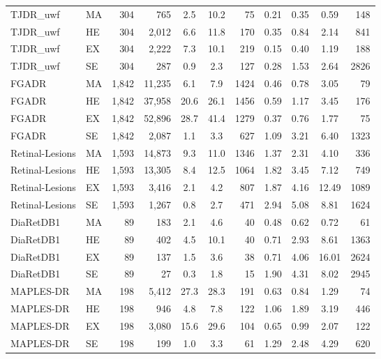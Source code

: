{\begin{longtable}{l l r r c c r c c c r}
TJDR\_uwf & MA & 304 & 765 & 2.5 & 10.2 & 75 & 0.21 & 0.35 & 0.59 & 148 \\
TJDR\_uwf & HE & 304 & 2,012 & 6.6 & 11.8 & 170 & 0.35 & 0.84 & 2.14 & 841 \\
TJDR\_uwf & EX & 304 & 2,222 & 7.3 & 10.1 & 219 & 0.15 & 0.40 & 1.19 & 188 \\
TJDR\_uwf & SE & 304 & 287 & 0.9 & 2.3 & 127 & 0.28 & 1.53 & 2.64 & 2826 \\
FGADR & MA & 1,842 & 11,235 & 6.1 & 7.9 & 1424 & 0.46 & 0.78 & 3.05 & 79 \\
FGADR & HE & 1,842 & 37,958 & 20.6 & 26.1 & 1456 & 0.59 & 1.17 & 3.45 & 176 \\
FGADR & EX & 1,842 & 52,896 & 28.7 & 41.4 & 1279 & 0.37 & 0.76 & 1.77 & 75 \\
FGADR & SE & 1,842 & 2,087 & 1.1 & 3.3 & 627 & 1.09 & 3.21 & 6.40 & 1323 \\
Retinal-Lesions & MA & 1,593 & 14,873 & 9.3 & 11.0 & 1346 & 1.37 & 2.31 & 4.10 & 336 \\
Retinal-Lesions & HE & 1,593 & 13,305 & 8.4 & 12.5 & 1064 & 1.82 & 3.45 & 7.12 & 749 \\
Retinal-Lesions & EX & 1,593 & 3,416 & 2.1 & 4.2 & 807 & 1.87 & 4.16 & 12.49 & 1089 \\
Retinal-Lesions & SE & 1,593 & 1,267 & 0.8 & 2.7 & 471 & 2.94 & 5.08 & 8.81 & 1624 \\
DiaRetDB1 & MA & 89 & 183 & 2.1 & 4.6 & 40 & 0.48 & 0.62 & 0.72 & 61 \\
DiaRetDB1 & HE & 89 & 402 & 4.5 & 10.1 & 40 & 0.71 & 2.93 & 8.61 & 1363 \\
DiaRetDB1 & EX & 89 & 137 & 1.5 & 3.6 & 38 & 0.71 & 4.06 & 16.01 & 2624 \\
DiaRetDB1 & SE & 89 & 27 & 0.3 & 1.8 & 15 & 1.90 & 4.31 & 8.02 & 2945 \\
MAPLES-DR & MA & 198 & 5,412 & 27.3 & 28.3 & 191 & 0.63 & 0.84 & 1.29 & 74 \\
MAPLES-DR & HE & 198 & 946 & 4.8 & 7.8 & 122 & 1.06 & 1.89 & 3.19 & 446 \\
MAPLES-DR & EX & 198 & 3,080 & 15.6 & 29.6 & 104 & 0.65 & 0.99 & 2.07 & 122 \\
MAPLES-DR & SE & 198 & 199 & 1.0 & 3.3 & 61 & 1.29 & 2.48 & 4.29 & 620 \\
\end{longtable}
}
